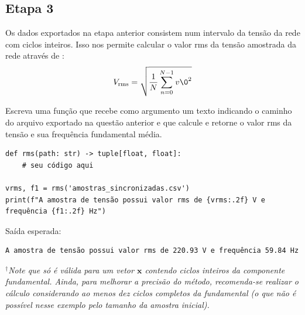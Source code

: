\subsection*{Etapa 3}
Os dados exportados na etapa anterior consistem num intervalo da tensão da rede com ciclos inteiros.
Isso nos permite calcular o valor rms da tensão amostrada da rede através de :
\begin{equation}\label{eq:rms}
V_{\text{rms}} = \sqrt{\dfrac{1}{N} \sum_ {n=0} ^{N-1} v\0 ^2}
\end{equation}

Escreva uma função   que recebe como argumento um texto indicando o caminho
do arquivo exportado na questão anterior e que calcule e retorne o valor rms da tensão e sua frequência fundamental média.
\begin{verbatim}
def rms(path: str) -> tuple[float, float]:
    # seu código aqui

vrms, f1 = rms('amostras_sincronizadas.csv')
print(f"A amostra de tensão possui valor rms de {vrms:.2f} V e frequência {f1:.2f} Hz")
\end{verbatim}

Saída esperada:
\begin{verbatim}
A amostra de tensão possui valor rms de 220.93 V e frequência 59.84 Hz
\end{verbatim}

$^\dagger$\emph{Note que  só é válida para um vetor $\mathbf{x}$ contendo ciclos inteiros da componente fundamental.
Ainda, para melhorar a precisão do método, recomenda-se realizar o cálculo considerando ao menos dez ciclos completos da fundamental
    (o que não é possível nesse exemplo pelo tamanho da amostra inicial).}


